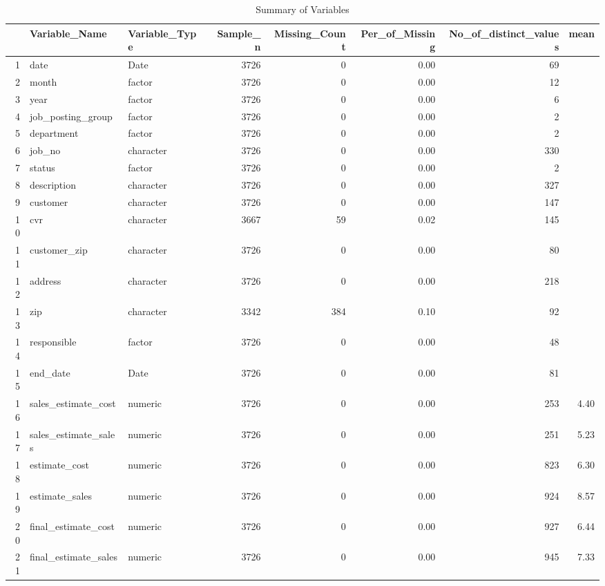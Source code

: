 \begin{sidewaystable}[ht]
\centering
\caption{Summary of Variables} 
\begin{tabular}{rllrrrrr}
  \hline
 & Variable\_Name & Variable\_Type & Sample\_n & Missing\_Count & Per\_of\_Missing & No\_of\_distinct\_values & mean \\ 
  \hline
1 & date & Date & 3726 &   0 & 0.00 &  69 &  \\ 
  2 & month & factor & 3726 &   0 & 0.00 &  12 &  \\ 
  3 & year & factor & 3726 &   0 & 0.00 &   6 &  \\ 
  4 & job\_posting\_group & factor & 3726 &   0 & 0.00 &   2 &  \\ 
  5 & department & factor & 3726 &   0 & 0.00 &   2 &  \\ 
  6 & job\_no & character & 3726 &   0 & 0.00 & 330 &  \\ 
  7 & status & factor & 3726 &   0 & 0.00 &   2 &  \\ 
  8 & description & character & 3726 &   0 & 0.00 & 327 &  \\ 
  9 & customer & character & 3726 &   0 & 0.00 & 147 &  \\ 
  10 & cvr & character & 3667 &  59 & 0.02 & 145 &  \\ 
  11 & customer\_zip & character & 3726 &   0 & 0.00 &  80 &  \\ 
  12 & address & character & 3726 &   0 & 0.00 & 218 &  \\ 
  13 & zip & character & 3342 & 384 & 0.10 &  92 &  \\ 
  14 & responsible & factor & 3726 &   0 & 0.00 &  48 &  \\ 
  15 & end\_date & Date & 3726 &   0 & 0.00 &  81 &  \\ 
  16 & sales\_estimate\_cost & numeric & 3726 &   0 & 0.00 & 253 & 4.40 \\ 
  17 & sales\_estimate\_sales & numeric & 3726 &   0 & 0.00 & 251 & 5.23 \\ 
  18 & estimate\_cost & numeric & 3726 &   0 & 0.00 & 823 & 6.30 \\ 
  19 & estimate\_sales & numeric & 3726 &   0 & 0.00 & 924 & 8.57 \\ 
  20 & final\_estimate\_cost & numeric & 3726 &   0 & 0.00 & 927 & 6.44 \\ 
  21 & final\_estimate\_sales & numeric & 3726 &   0 & 0.00 & 945 & 7.33 \\ 

\end{tabular}
\end{sidewaystable}
